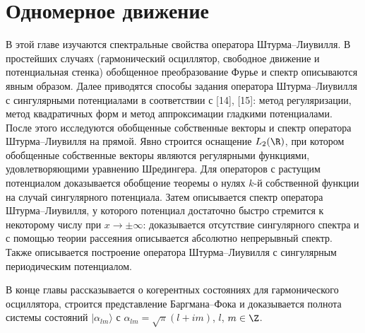 \documentclass[a4paper
]{article}
\begin{document}
\section{Одномерное движение}
\label{1dimension}
В этой главе изучаются спектральные свойства оператора Штурма--Лиувилля.
В простейших случаях (гармонический осциллятор, свободное движение
и потенциальная стенка) обобщенное преобразование Фурье и спектр
описываются явным образом. Далее приводятся способы задания оператора
Штурма--Лиувилля с сингулярными потенциалами в соответствии с [14],
[15]: метод регуляризации, метод квадратичных форм и метод аппроксимации
гладкими потенциалами. После этого исследуются обобщенные собственные
векторы и спектр оператора Штурма--Лиувилля на прямой. Явно строится
оснащение $L_2(\R)$, при котором обобщенные собственные векторы являются
регулярными функциями, удовлетворяющими уравнению Шредингера. Для
операторов с растущим потенциалом доказывается обобщение теоремы о
нулях $k$-й собственной функции на случай сингулярного потенциала.
Затем описывается спектр оператора Штурма--Лиувилля, у которого
потенциал достаточно быстро стремится к некоторому числу при $x\rightarrow
\pm \infty$: доказывается отсутствие сингулярного спектра и с помощью
теории рассеяния описывается абсолютно непрерывный спектр. Также
описывается построение оператора Штурма--Лиувилля с сингулярным
периодическим потенциалом. \par
В конце главы рассказывается о когерентных состояниях для гармонического
осциллятора, строится представление Баргмана--Фока и доказывается
полнота системы состояний $|\alpha _{lm}\rangle$ с $\alpha _{lm}=
\sqrt{\pi}(l+im)$, $l$, $m\in \Z$.
\end{document}
